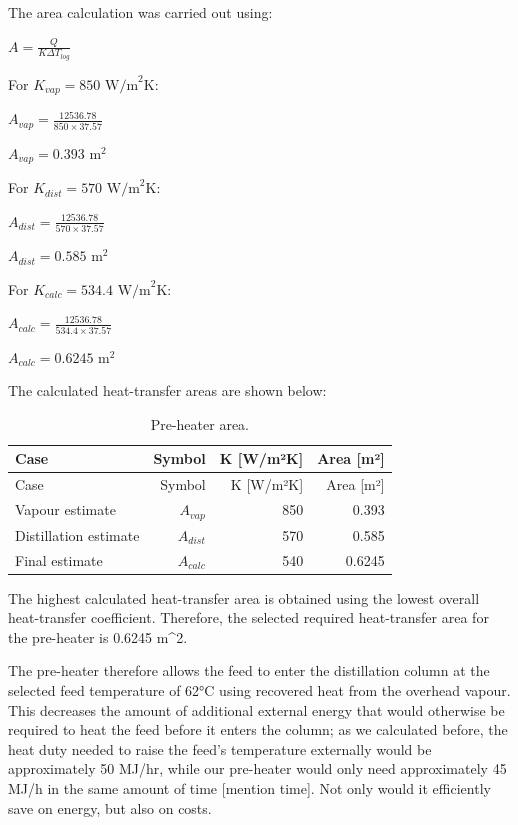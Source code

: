The area calculation was carried out using:

\(A = \frac{Q}{K \Delta T_{log}}\)

For \(K_{vap} = 850 \text{ W/m}^2\text{K}\):

\(A_{vap} = \frac{12536.78}{850 \times 37.57}\)

\(A_{vap} = 0.393 \text{ m}^2\)

For \(K_{dist} = 570 \text{ W/m}^2\text{K}\):

\(A_{dist} = \frac{12536.78}{570 \times 37.57}\)

\(A_{dist} = 0.585 \text{ m}^2\)

For \(K_{calc} = 534.4 \text{ W/m}^2\text{K}\):

\(A_{calc} = \frac{12536.78}{534.4 \times 37.57}\)

\(A_{calc} = 0.6245 \text{ m}^2\)

The calculated heat-transfer areas are shown below:

\begin{longtable}[]{@{}lrrr@{}}
\caption{Pre-heater area. \label{tab:Pre-heater area}}\tabularnewline
\toprule\noalign{}
Case & Symbol & K {[}W/m²K{]} & Area {[}m²{]} \\
\midrule\noalign{}
\endfirsthead
\toprule\noalign{}
Case & Symbol & K {[}W/m²K{]} & Area {[}m²{]} \\
\midrule\noalign{}
\endhead
\bottomrule\noalign{}
\endlastfoot
Vapour estimate & \(A_{vap}\) & 850 & 0.393 \\
Distillation estimate & \(A_{dist}\) & 570 & 0.585 \\
Final estimate & \(A_{calc}\) & 540 & 0.6245 \\
\end{longtable}

The highest calculated heat-transfer area is obtained using the lowest
overall heat-transfer coefficient. Therefore, the selected required
heat-transfer area for the pre-heater is 0.6245 m\^{}2.

The pre-heater therefore allows the feed to enter the distillation
column at the selected feed temperature of 62°C using recovered heat
from the overhead vapour. This decreases the amount of additional
external energy that would otherwise be required to heat the feed before
it enters the column; as we calculated before, the heat duty needed to
raise the feed's temperature externally would be approximately 50 MJ/hr,
while our pre-heater would only need approximately 45 MJ/h in the same
amount of time {[}mention time{]}. Not only would it efficiently save on
energy, but also on costs.

